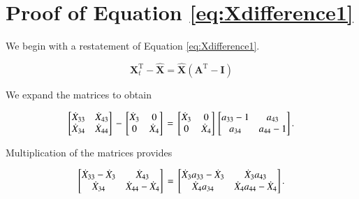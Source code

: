 \documentclass[authoryear,preprint,review,12pt]{elsarticle}
\let\oldhat\hat
\renewcommand{\vec}[1]{\mathbf{#1}}
\renewcommand{\hat}[1]{\oldhat{\mathbf{#1}}}
\begin{document}
\appendix

\section{Proof of Equation \ref{eq:Xdifference1}}

We begin with a restatement of Equation \ref{eq:Xdifference1}.

\begin{equation} \label{eq:Xdifference1Proof-1}
	\vec{X}_t^\mathrm{T} - \hat{\vec{X}} = \hat{\vec{X}}(\vec{A}^\mathrm{T} - \vec{I})
\end{equation}

\noindent We expand the matrices to obtain

\begin{equation} \label{eq:Xdifference1Proof-2}
\begin{bmatrix} 	\dot{X}_{33} & \dot{X}_{43}	\\
				\dot{X}_{34} & \dot{X}_{44}	\\
\end{bmatrix} \\
- \\
\begin{bmatrix} 	\dot{X}_{3} & 0	\\
				0 & \dot{X}_{4}	\\
\end{bmatrix} \\
= \\
\begin{bmatrix} 	\dot{X}_{3} & 0	\\
				0 & \dot{X}_{4}	\\
\end{bmatrix} \\
\begin{bmatrix} 	a_{33}-1 & a_{43}	\\
				a_{34} & a_{44}-1	\\
\end{bmatrix}.
\end{equation}

\noindent Multiplication of the matrices provides

\begin{equation} \label{eq:Xdifference1Proof-3}
\begin{bmatrix} 	\dot{X}_{33} - \dot{X}_3 & \dot{X}_{43}	\\
				\dot{X}_{34} & \dot{X}_{44} - \dot{X}_4	\\
\end{bmatrix} \\
= \\
\begin{bmatrix} 	\dot{X}_3 a_{33} - \dot{X}_3 & \dot{X}_3 a_{43}	\\
				\dot{X}_4 a_{34} & \dot{X}_4 a_{44} - \dot{X}_4	\\
\end{bmatrix}.
\end{equation}
\end{document}
